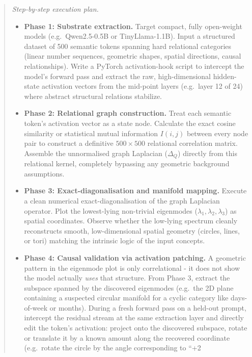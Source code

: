 \documentclass[11pt]{article}
\begin{document}
\begin{quote}
\textit{Step-by-step execution plan.}
\begin{itemize}
  \item \textbf{Phase 1: Substrate extraction.} Target compact, fully
        open-weight models (e.g.\ Qwen2.5-0.5B or TinyLlama-1.1B). Input a
        structured dataset of 500 semantic tokens spanning hard relational
        categories (linear number sequences, geometric shapes, spatial
        directions, causal relationships). Write a PyTorch activation-hook
        script to intercept the model's forward pass and extract the raw,
        high-dimensional hidden-state activation vectors from the
        mid-point layers (e.g.\ layer 12 of 24) where abstract structural
        relations stabilize.
  \item \textbf{Phase 2: Relational graph construction.} Treat each
        semantic token's activation vector as a state node. Calculate the
        exact cosine similarity or statistical mutual information
        $I(i,j)$ between every node pair to construct a definitive
        $500 \times 500$ relational correlation matrix. Assemble the
        unnormalised graph Laplacian ($\Delta_Q$) directly from this
        relational kernel, completely bypassing any geometric background
        assumptions.
  \item \textbf{Phase 3: Exact-diagonalisation and manifold mapping.}
        Execute a clean numerical exact-diagonalisation of the graph
        Laplacian operator. Plot the lowest-lying non-trivial eigenmodes
        ($\lambda_1, \lambda_2, \lambda_3$) as spatial coordinates. Observe
        whether the low-lying spectrum cleanly reconstructs smooth,
        low-dimensional spatial geometry (circles, lines, or tori) matching
        the intrinsic logic of the input concepts.
  \item \textbf{Phase 4: Causal validation via activation patching.} A
        geometric pattern in the eigenmode plot is only correlational -
        it does not show the model actually \emph{uses} that structure.
        From Phase 3, extract the subspace spanned by the discovered
        eigenmodes (e.g.\ the 2D plane containing a suspected circular
        manifold for a cyclic category like days-of-week or months).
        During a fresh forward pass on a held-out prompt, intercept the
        residual stream at the same extraction layer and directly edit the
        token's activation: project onto the discovered subspace, rotate
        or translate it by a known amount along the recovered coordinate
        (e.g.\ rotate the circle by the angle corresponding to ``+2

\end{itemize}
\end{quote}
\end{document}
